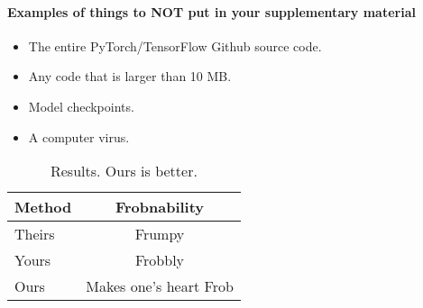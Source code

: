 \documentclass[10pt,twocolumn,letterpaper]{article}
\begin{document}
\paragraph{Examples of things to NOT put in your supplementary material}
\begin{itemize}
    \item The entire PyTorch/TensorFlow Github source code.
    \item Any code that is larger than 10 MB.
    \item Model checkpoints.
    \item A computer virus.
\end{itemize}


\begin{table}
\begin{center}
\begin{tabular}{|l|c|}
\hline
Method & Frobnability \\
\hline\hline
Theirs & Frumpy \\
Yours & Frobbly \\
Ours & Makes one's heart Frob\\
\hline
\end{tabular}
\end{center}
\caption{Results.   Ours is better.}
\end{table}


{
\small


}
\end{document}
